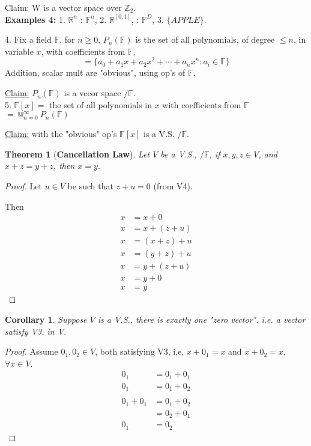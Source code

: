 \documentclass[12pt]{article}
\theoremstyle{plain}
\newtheorem{theorem}{Theorem}[subsection]
\newtheorem{corollary}{Corollary}[subsection]
\begin{document}
{	Claim: W is a vector space over $\mathbb{Z}_2$.\\

	\textbf{Examples 4: }
	1. $\mathbb{R}^n$ : $\mathbb{F}^n$, 
	2. $\mathbb{R}^{[0,1]}$, : $\mathbb{F}^D$, 
	3. $\{APPLE\}$.
	
	4. Fix a field $\mathbb{F}$, for $n\geq 0$, $P_n(\mathbb{F})$ is the set of 
	all polynomials, of degree $\leq n$, in variable $x$, with coefficients 
	from $\mathbb{F}$, 
	\[
		=\{a_0+a_1x+a_2x^2+\cdots+a_nx^n: a_i\in \mathbb{F}\}
	\]
	Addition, scalar mult are "obvious", using op's of $\mathbb{F}$. 
	
	\underline{Claim:} $P_n(\mathbb{F})$ is a vecor space $/\mathbb{F}$.\\

	5. $\mathbb{F}[x] = $ the set of all polynomials in $x$ with coefficients
	from $\mathbb{F}$ $=\Cup^{\infty}_{n=0} P_n(\mathbb{F})$

	\underline{Claim:} with the "obvious" op's $\mathbb{F}[x]$ is a V.S. 
	$/\mathbb{F}$. \\
	}
	
	\begin{theorem}[\textbf{Cancellation Law}]
		Let $V$ be a V.S., $/\mathbb{F}$, if $x, y, z\in V$, and $x+z=y+z$, 
		then $x=y$. 
	\end{theorem}
	\begin{proof}
		Let $u\in V$ be such that $z+u = 0$ (from V4). 
		
		Then \begin{align*}
			x	&= x + 0  \tag{V3}\\
			x	&= x + (z + u) \tag{Choice of u}\\
			x	&= (x + z) + u \tag{hypothesis}\\
			x	&= (y + z) + u \tag{V2}\\
			x	&= y + (z + u) \tag {V2}\\
			x	&= y + 0 \tag{choice of u}\\
			x	&= y
		\end{align*}
	\end{proof}

	\begin{corollary}
		Suppose $V$ is a V.S., there is exactly one "zero vector". i.e.
		a vector satisfy V3. in V.
	\end{corollary}
	\begin{proof}
		Assume $0_1, 0_2 \in V$, both satisfying V3, i,e, $x+0_1 = x$ and 
		$x+0_2 = x$, $\forall x\in V$.
		\begin{align*}
			0_1 &= 0_1 + 0_1\\
			0_1 &= 0_1 + 0_2\\\\
			0_1+0_1 &=0_1+0_2\\
			 &=0_2+0_1 \tag{V1}\\
			0_1&=0_2 \tag{By Cancellation}
		\end{align*}
	\end{proof}
\end{document}

